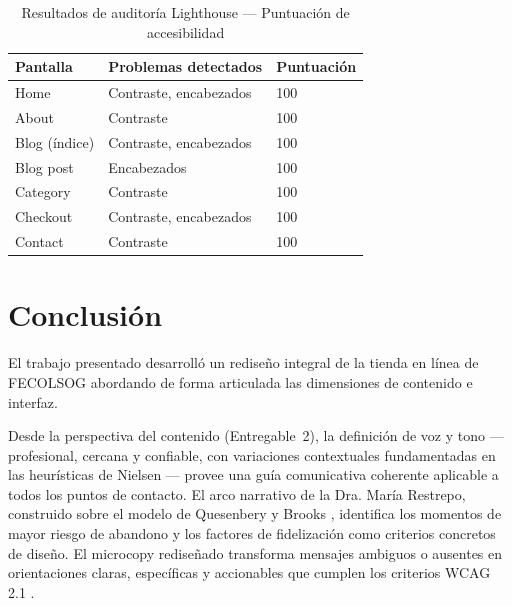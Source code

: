 \documentclass[conference]{IEEEtran}
\begin{document}
\begin{table}[H]
\centering
\caption{Resultados de auditoría Lighthouse — Puntuación de accesibilidad}
\label{tab:lighthouse}
\setlength{\tabcolsep}{3pt}
\renewcommand{\arraystretch}{1.2}
\begin{tabular}{|p{3.2cm}|p{2.8cm}|p{1.5cm}|}
\hline
\textbf{Pantalla} & \textbf{Problemas detectados} & \textbf{Puntuación} \\
\hline
Home & Contraste, encabezados & 100 \\
\hline
About & Contraste & 100 \\
\hline
Blog (índice) & Contraste, encabezados & 100 \\
\hline
Blog post & Encabezados & 100 \\
\hline
Category & Contraste & 100 \\
\hline
Checkout & Contraste, encabezados & 100 \\
\hline
Contact & Contraste & 100 \\
\hline
\end{tabular}
\end{table}

\section{Conclusión}

El trabajo presentado desarrolló un rediseño integral de la tienda en línea de FECOLSOG abordando de forma articulada las dimensiones de contenido e interfaz.

Desde la perspectiva del contenido (Entregable~2), la definición de voz y tono —profesional, cercana y confiable, con variaciones contextuales fundamentadas en las heurísticas de Nielsen \cite{nielsen-1994}— provee una guía comunicativa coherente aplicable a todos los puntos de contacto. El arco narrativo de la Dra. María Restrepo, construido sobre el modelo de Quesenbery y Brooks \cite{storytelling-ux}, identifica los momentos de mayor riesgo de abandono y los factores de fidelización como criterios concretos de diseño. El microcopy rediseñado transforma mensajes ambiguos o ausentes en orientaciones claras, específicas y accionables que cumplen los criterios WCAG 2.1 \cite{wcag-2018}.
\end{document}
